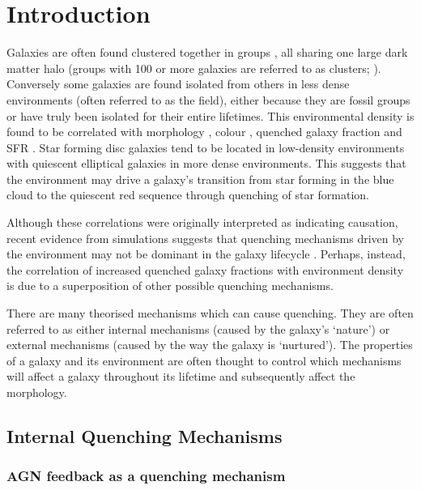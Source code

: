 \documentclass[useAMS,usenatbib]{mn2e}
\begin{document}
\section{Introduction}\label{sec:intro}

Galaxies are often found clustered together in groups \citep{zwicky38, zwicky52, abell58}, all sharing one large dark matter halo (groups with 100 or more galaxies are referred to as clusters; \citealt{bower04}). Conversely some galaxies are found isolated from others in less dense environments (often referred to as the field), either because they are fossil groups \citep[where all members have eventually merged;][]{ponman94, jones00, jones03} or have truly been isolated for their entire lifetimes. This environmental density is found to be correlated with morphology \citep{dressler80, smail97, poggianti99, postman05, Bamford09}, colour \citep{butcher78, pimbblet02}, quenched galaxy fraction \citep{kauffmann03, Baldry06, peng12, darvish16} and SFR \citep{gomez03}. Star forming disc galaxies tend to be located in low-density environments with quiescent elliptical galaxies in more dense environments. This suggests that the environment may drive a galaxy's transition from star forming in the blue cloud to the quiescent red sequence through quenching of star formation. 
 
Although these correlations were originally interpreted as indicating causation, recent evidence from simulations suggests that quenching mechanisms driven by the environment may not be dominant in the galaxy lifecycle \citep{kimm09, kimm11, hirschmann14, wang14, phillips15, emerick16, fillingham16}. Perhaps, instead, the correlation of increased quenched galaxy fractions with environment density is due to a superposition of other possible quenching mechanisms.

There are many theorised mechanisms which can cause quenching. They are often referred to as either internal mechanisms (caused by the galaxy's `nature') or external mechanisms (caused by the way the galaxy is `nurtured'). The properties of a galaxy and its environment are often thought to control which mechanisms will affect a galaxy throughout its lifetime and subsequently affect the morphology. 

\subsection{Internal Quenching Mechanisms}\label{sec:intquench}

\subsubsection{AGN feedback as a quenching mechanism}\label{sec:agnquench}
\end{document}
